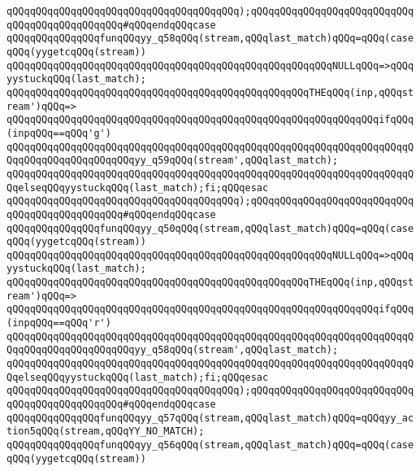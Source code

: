 \verb|qQQqqQQqqQQqqQQqqQQqqQQqqQQqqQQqqQQqqQQq);qQQqqQQqqQQqqQQqqQQqqQQqqQQqqQQqqQQqqQQqqQQqqQQq#qQQqendqQQqcase|\newline
\verb|qQQqqQQqqQQqqQQqfunqQQqyy_q58qQQq(stream,qQQqlast_match)qQQq=qQQq(caseqQQq(yygetcqQQq(stream))|\newline
\verb|qQQqqQQqqQQqqQQqqQQqqQQqqQQqqQQqqQQqqQQqqQQqqQQqqQQqqQQqNULLqQQq=>qQQqyystuckqQQq(last_match);|\newline
\verb|qQQqqQQqqQQqqQQqqQQqqQQqqQQqqQQqqQQqqQQqqQQqqQQqqQQqTHEqQQq(inp,qQQqstream')qQQq=>|\newline
\verb|qQQqqQQqqQQqqQQqqQQqqQQqqQQqqQQqqQQqqQQqqQQqqQQqqQQqqQQqqQQqqQQqifqQQq(inpqQQq==qQQq'g')|\newline
\verb|qQQqqQQqqQQqqQQqqQQqqQQqqQQqqQQqqQQqqQQqqQQqqQQqqQQqqQQqqQQqqQQqqQQqqQQqqQQqqQQqqQQqqQQqqQQqyy_q59qQQq(stream',qQQqlast_match);|\newline
\verb|qQQqqQQqqQQqqQQqqQQqqQQqqQQqqQQqqQQqqQQqqQQqqQQqqQQqqQQqqQQqqQQqqQQqqQQqelseqQQqyystuckqQQq(last_match);fi;qQQqesac|\newline
\verb|qQQqqQQqqQQqqQQqqQQqqQQqqQQqqQQqqQQqqQQq);qQQqqQQqqQQqqQQqqQQqqQQqqQQqqQQqqQQqqQQqqQQqqQQq#qQQqendqQQqcase|\newline
\verb|qQQqqQQqqQQqqQQqfunqQQqyy_q50qQQq(stream,qQQqlast_match)qQQq=qQQq(caseqQQq(yygetcqQQq(stream))|\newline
\verb|qQQqqQQqqQQqqQQqqQQqqQQqqQQqqQQqqQQqqQQqqQQqqQQqqQQqqQQqNULLqQQq=>qQQqyystuckqQQq(last_match);|\newline
\verb|qQQqqQQqqQQqqQQqqQQqqQQqqQQqqQQqqQQqqQQqqQQqqQQqqQQqTHEqQQq(inp,qQQqstream')qQQq=>|\newline
\verb|qQQqqQQqqQQqqQQqqQQqqQQqqQQqqQQqqQQqqQQqqQQqqQQqqQQqqQQqqQQqqQQqifqQQq(inpqQQq==qQQq'r')|\newline
\verb|qQQqqQQqqQQqqQQqqQQqqQQqqQQqqQQqqQQqqQQqqQQqqQQqqQQqqQQqqQQqqQQqqQQqqQQqqQQqqQQqqQQqqQQqqQQqyy_q58qQQq(stream',qQQqlast_match);|\newline
\verb|qQQqqQQqqQQqqQQqqQQqqQQqqQQqqQQqqQQqqQQqqQQqqQQqqQQqqQQqqQQqqQQqqQQqqQQqelseqQQqyystuckqQQq(last_match);fi;qQQqesac|\newline
\verb|qQQqqQQqqQQqqQQqqQQqqQQqqQQqqQQqqQQqqQQq);qQQqqQQqqQQqqQQqqQQqqQQqqQQqqQQqqQQqqQQqqQQqqQQq#qQQqendqQQqcase|\newline
\verb|qQQqqQQqqQQqqQQqfunqQQqyy_q57qQQq(stream,qQQqlast_match)qQQq=qQQqyy_action5qQQq(stream,qQQqYY_NO_MATCH);|\newline
\verb|qQQqqQQqqQQqqQQqfunqQQqyy_q56qQQq(stream,qQQqlast_match)qQQq=qQQq(caseqQQq(yygetcqQQq(stream))|\newline
